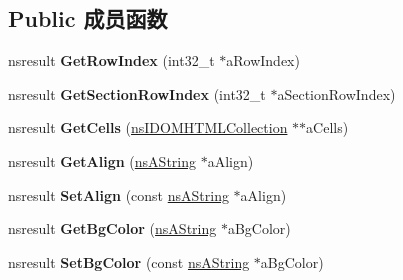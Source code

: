 \subsection*{Public 成员函数}
\begin{DoxyCompactItemize}
\item 
\mbox{\label{interfacens_i_d_o_m_h_t_m_l_table_row_element_a0fe9441233e6836390077622fcc03ebf}} 
nsresult {\bfseries Get\+Row\+Index} (int32\+\_\+t $\ast$a\+Row\+Index)
\item 
\mbox{\label{interfacens_i_d_o_m_h_t_m_l_table_row_element_a48313d355874d9e205dd1b19c8aec521}} 
nsresult {\bfseries Get\+Section\+Row\+Index} (int32\+\_\+t $\ast$a\+Section\+Row\+Index)
\item 
\mbox{\label{interfacens_i_d_o_m_h_t_m_l_table_row_element_a5de5a2ea3a51d4da89bfb068a0aa33ee}} 
nsresult {\bfseries Get\+Cells} (\hyperlink{interfacens_i_d_o_m_h_t_m_l_collection}{ns\+I\+D\+O\+M\+H\+T\+M\+L\+Collection} $\ast$$\ast$a\+Cells)
\item 
\mbox{\label{interfacens_i_d_o_m_h_t_m_l_table_row_element_abdcd61ea2ff03c718d5a41f1ec34e841}} 
nsresult {\bfseries Get\+Align} (\hyperlink{structns_string_container}{ns\+A\+String} $\ast$a\+Align)
\item 
\mbox{\label{interfacens_i_d_o_m_h_t_m_l_table_row_element_a64e6a4a0c44d5ac9bd6062cbbd46c4c8}} 
nsresult {\bfseries Set\+Align} (const \hyperlink{structns_string_container}{ns\+A\+String} $\ast$a\+Align)
\item 
\mbox{\label{interfacens_i_d_o_m_h_t_m_l_table_row_element_a90cf9ef306d8df630d5220dfd2ceb0bd}} 
nsresult {\bfseries Get\+Bg\+Color} (\hyperlink{structns_string_container}{ns\+A\+String} $\ast$a\+Bg\+Color)
\item 
\mbox{\label{interfacens_i_d_o_m_h_t_m_l_table_row_element_ae68ae181c7939140ce0131f94322be95}} 
nsresult {\bfseries Set\+Bg\+Color} (const \hyperlink{structns_string_container}{ns\+A\+String} $\ast$a\+Bg\+Color)
$$
\end{DoxyCompactItemize}
